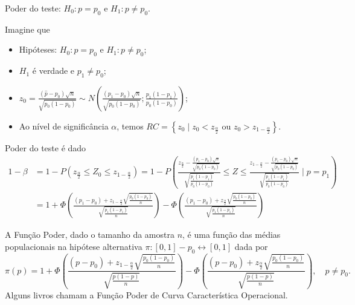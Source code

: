 \documentclass[8pt]{beamer}
\begin{document}
\begin{frame}{Poder do teste: $H_0: p = p_0$ e $H_1: p \neq p_0$.}

\scriptsize

Imagine que 
\begin{itemize}
	\item Hipóteses: $H_0:p=p_0$ e $H_1: p \neq p_0$;
	\item $H_1$ é verdade e $p_1 \neq p_0$;
	\item $z_0 = \frac{(\hat{p}-p_0)\sqrt{n}}{\sqrt{p_0 (1-p_0)}} \sim N \left( \frac{(p_1 - p_0)\sqrt{n}}{\sqrt{p_0(1-p_0)}}; \frac{p_1(1-p_1)}{p_0(1-p_0)} \right)$;
	\item Ao nível de significância $\alpha$, temos $RC = \left\{ z_0 \mid z_0 < z_\frac{\alpha}{2} \mbox{ ou } z_0 > z_{1-\frac{\alpha}{2}}  \right\}$.
\end{itemize}

Poder do teste é dado
\begin{align*}
	1-\beta &= 1 - P\left( z_\frac{\alpha}{2} \leq Z_0 \leq  z_{1-\frac{\alpha}{2}} \right) = 1 - P \left( 
	\frac{ z_\frac{\alpha}{2} - \frac{(p_1 - p_0)\sqrt{n}}{\sqrt{p_0(1-p_0)}}  }{ \sqrt{\frac{ p_1(1 - p_1) }{ p_0(1 - p_0) }} } \leq Z \leq  \frac{ z_{1-\frac{\alpha}{2}} - \frac{(p_1 - p_0)\sqrt{n}}{\sqrt{p_0(1-p_0)}}  }{ \sqrt{\frac{ p_1(1 - p_1) }{ p_0(1 - p_0) }} }
	 \mid p = p_1 \right) \\
	&= 1 + \Phi\left( \frac{ (p_1 - p_0) + z_{1-\frac{\alpha}{2}}\sqrt{\frac{p_0(1-p_0)}{n}} }{ \sqrt{\frac{p_1(1-p_1)}{n}} } \right) - \Phi\left( \frac{ (p_1 - p_0) + z_\frac{\alpha}{2}\sqrt{\frac{p_0(1-p_0)}{n}} }{ \sqrt{\frac{p_1(1-p_1)}{n}} } \right) 
\end{align*}

A \textcolor{important}{Função Poder}, dado o tamanho da amostra $n$, é uma função das médias populacionais na hipótese alternativa $\pi: [0,1]-{p_0} \longleftrightarrow [0,1] $ dada por
$$\pi(p) = 1 + \Phi\left( \frac{ (p - p_0) + z_{1-\frac{\alpha}{2}}\sqrt{\frac{p_0(1-p_0)}{n}} }{ \sqrt{\frac{p(1-p)}{n}} } \right) - \Phi\left( \frac{ (p - p_0) + z_\frac{\alpha}{2}\sqrt{\frac{p_0(1-p_0)}{n}} }{ \sqrt{\frac{p(1-p)}{n}} } \right), \quad p \neq p_0.$$
Alguns livros chamam a Função Poder de \textcolor{important}{Curva Característica Operacional}.

\normalsize

\end{frame}
\end{document}

